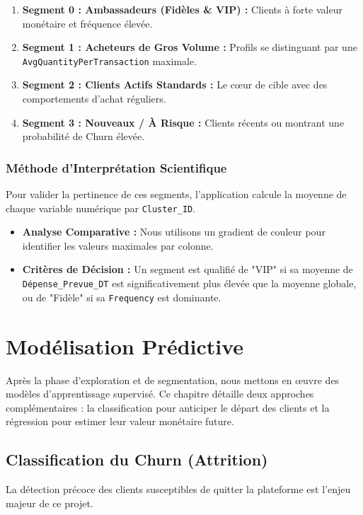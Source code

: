 \documentclass[11pt,a4paper]{article}
\begin{document}
\begin{enumerate}
    \item \textbf{Segment 0 : Ambassadeurs (Fidèles \& VIP) :} Clients à forte valeur monétaire et fréquence élevée.
    \item \textbf{Segment 1 : Acheteurs de Gros Volume :} Profils se distinguant par une \texttt{AvgQuantityPerTransaction} maximale.
    \item \textbf{Segment 2 : Clients Actifs Standards :} Le cœur de cible avec des comportements d'achat réguliers.
    \item \textbf{Segment 3 : Nouveaux / À Risque :} Clients récents ou montrant une probabilité de Churn élevée.
\end{enumerate}

\subsubsection{Méthode d'Interprétation Scientifique}
Pour valider la pertinence de ces segments, l'application calcule la moyenne de chaque variable numérique par \texttt{Cluster\_ID}. 
\begin{itemize}
    \item \textbf{Analyse Comparative :} Nous utilisons un gradient de couleur pour identifier les valeurs maximales par colonne.
    \item \textbf{Critères de Décision :} Un segment est qualifié de "VIP" si sa moyenne de \texttt{Dépense\_Prevue\_DT} est significativement plus élevée que la moyenne globale, ou de "Fidèle" si sa \texttt{Frequency} est dominante.
\end{itemize}

\section{Modélisation Prédictive}

Après la phase d'exploration et de segmentation, nous mettons en œuvre des modèles d'apprentissage supervisé. Ce chapitre détaille deux approches complémentaires : la classification pour anticiper le départ des clients et la régression pour estimer leur valeur monétaire future.

\subsection{Classification du Churn (Attrition)}
La détection précoce des clients susceptibles de quitter la plateforme est l'enjeu majeur de ce projet.
\end{document}
